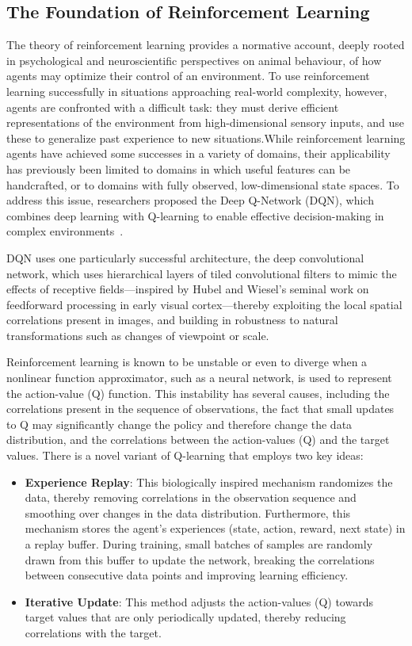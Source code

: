 \documentclass[journal]{IEEEtran}
\begin{document}
\subsection{The Foundation of Reinforcement Learning}
The theory of reinforcement learning provides a normative account, deeply rooted in psychological and neuroscientific perspectives on animal behaviour, of how agents may optimize their control of an environment. To use reinforcement learning successfully in situations approaching real-world complexity, however, agents are confronted with a difficult task: they must derive efficient representations of the environment from high-dimensional sensory inputs, and use these to generalize past experience to new situations.While reinforcement learning agents have achieved some successes in a variety of domains, their applicability has previously been limited to domains in which useful features can be handcrafted, or to domains with fully observed, low-dimensional state spaces. To address this issue, researchers proposed the Deep Q-Network (DQN), which combines deep learning with Q-learning to enable effective decision-making in complex environments~\cite{pyyz001}.

DQN uses one particularly successful architecture, the deep convolutional network, which uses hierarchical layers of tiled convolutional filters to mimic the effects of receptive fields—inspired by Hubel and Wiesel’s seminal work on feedforward processing in early visual cortex—thereby exploiting the local spatial correlations present in images, and building in robustness to natural transformations such as changes of viewpoint or scale.

Reinforcement learning is known to be unstable or even to diverge when a nonlinear function approximator, such as a neural network, is used to represent the action-value (Q) function. This instability has several causes, including the correlations present in the sequence of observations, the fact that small updates to Q may significantly change the policy and therefore change the data distribution, and the correlations between the action-values (Q) and the target values. There is a novel variant of Q-learning that employs two key ideas:

\begin{itemize}
\item \textbf{Experience Replay}: This biologically inspired mechanism randomizes the data, thereby removing correlations in the observation sequence and smoothing over changes in the data distribution. Furthermore, this mechanism stores the agent's experiences (state, action, reward, next state) in a replay buffer. During training, small batches of samples are randomly drawn from this buffer to update the network, breaking the correlations between consecutive data points and improving learning efficiency.
\item \textbf{Iterative Update}: This method adjusts the action-values (Q) towards target values that are only periodically updated, thereby reducing correlations with the target. 
\end{itemize}
\end{document}

